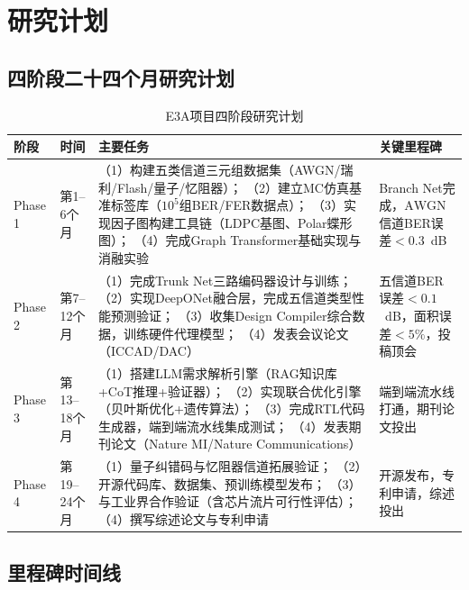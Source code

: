 ﻿\section{研究计划}\label{sec:plan}

\subsection{四阶段二十四个月研究计划}

\begin{table}[htbp]
\centering
\caption{E3A项目四阶段研究计划}
\label{tab:plan}
\setlength{\tabcolsep}{5pt}
\begin{tabular}{@{}L{1.5cm}L{2.2cm}L{6.5cm}L{2.5cm}@{}}
\toprule
\textbf{阶段} & \textbf{时间} & \textbf{主要任务} & \textbf{关键里程碑} \\
\midrule
Phase 1 & 第1--6个月 &
  （1）构建五类信道三元组数据集（AWGN/瑞利/Flash/量子/忆阻器）；
  （2）建立MC仿真基准标签库（$10^5$组BER/FER数据点）；
  （3）实现因子图构建工具链（LDPC基图、Polar蝶形图）；
  （4）完成Graph Transformer基础实现与消融实验
  &
  Branch Net完成，$\mathrm{AWGN}$信道BER误差$<0.3$~dB \\
Phase 2 & 第7--12个月 &
  （1）完成Trunk Net三路编码器设计与训练；
  （2）实现DeepONet融合层，完成五信道类型性能预测验证；
  （3）收集Design Compiler综合数据，训练硬件代理模型；
  （4）发表会议论文（ICCAD/DAC）
  &
  五信道BER误差$<0.1$~dB，面积误差$<5\%$，投稿顶会 \\
Phase 3 & 第13--18个月 &
  （1）搭建LLM需求解析引擎（RAG知识库+CoT推理+验证器）；
  （2）实现联合优化引擎（贝叶斯优化+遗传算法）；
  （3）完成RTL代码生成器，端到端流水线集成测试；
  （4）发表期刊论文（Nature MI/Nature Communications）
  &
  端到端流水线打通，期刊论文投出 \\
Phase 4 & 第19--24个月 &
  （1）量子纠错码与忆阻器信道拓展验证；
  （2）开源代码库、数据集、预训练模型发布；
  （3）与工业界合作验证（含芯片流片可行性评估）；
  （4）撰写综述论文与专利申请
  &
  开源发布，专利申请，综述投出 \\
\bottomrule
\end{tabular}
\end{table}

\subsection{里程碑时间线}

